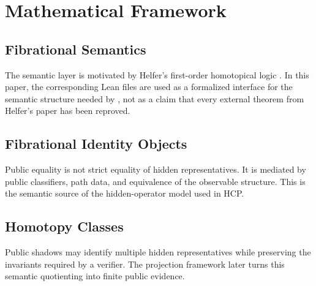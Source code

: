 \section{Mathematical Framework}

\subsection{Fibrational Semantics}

The semantic layer is motivated by Helfer's first-order homotopical logic
\cite{helfer2019fol}. In this paper, the corresponding Lean files are used as
a formalized interface for the semantic structure needed by \HE{}, not as a
claim that every external theorem from Helfer's paper has been reproved.

\subsection{Fibrational Identity Objects}

Public equality is not strict equality of hidden representatives. It is mediated
by public classifiers, path data, and equivalence of the observable structure.
This is the semantic source of the hidden-operator model used in HCP.

\subsection{Homotopy Classes}

Public shadows may identify multiple hidden representatives while preserving
the invariants required by a verifier. The projection framework later turns
this semantic quotienting into finite public evidence.
